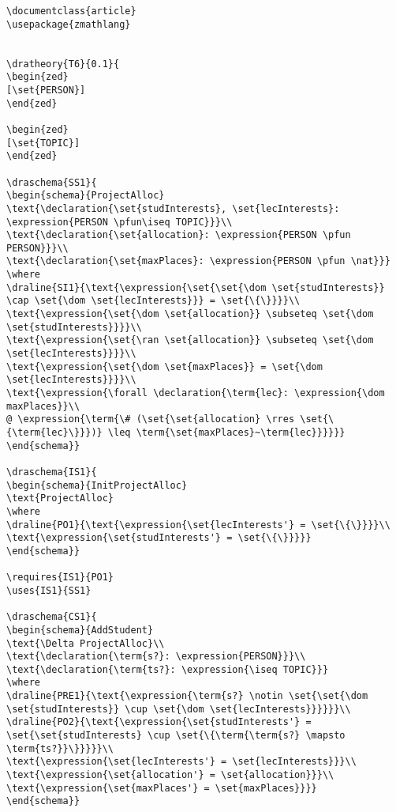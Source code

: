 \begin{verbatim}
\documentclass{article}
\usepackage{zmathlang}


\dratheory{T6}{0.1}{
\begin{zed}
[\set{PERSON}]
\end{zed}

\begin{zed}
[\set{TOPIC}]
\end{zed}

\draschema{SS1}{
\begin{schema}{ProjectAlloc}
\text{\declaration{\set{studInterests}, \set{lecInterests}: \expression{PERSON \pfun\iseq TOPIC}}}\\
\text{\declaration{\set{allocation}: \expression{PERSON \pfun PERSON}}}\\
\text{\declaration{\set{maxPlaces}: \expression{PERSON \pfun \nat}}}
\where
\draline{SI1}{\text{\expression{\set{\set{\dom \set{studInterests}} \cap \set{\dom \set{lecInterests}}} = \set{\{\}}}}\\
\text{\expression{\set{\dom \set{allocation}} \subseteq \set{\dom \set{studInterests}}}}\\
\text{\expression{\set{\ran \set{allocation}} \subseteq \set{\dom \set{lecInterests}}}}\\
\text{\expression{\set{\dom \set{maxPlaces}} = \set{\dom \set{lecInterests}}}}\\
\text{\expression{\forall \declaration{\term{lec}: \expression{\dom maxPlaces}}\\
@ \expression{\term{\# (\set{\set{allocation} \rres \set{\{\term{lec}\}}})} \leq \term{\set{maxPlaces}~\term{lec}}}}}}
\end{schema}}

\draschema{IS1}{
\begin{schema}{InitProjectAlloc}
\text{ProjectAlloc}
\where
\draline{PO1}{\text{\expression{\set{lecInterests'} = \set{\{\}}}}\\
\text{\expression{\set{studInterests'} = \set{\{\}}}}}
\end{schema}}

\requires{IS1}{PO1}
\uses{IS1}{SS1}

\draschema{CS1}{
\begin{schema}{AddStudent}
\text{\Delta ProjectAlloc}\\
\text{\declaration{\term{s?}: \expression{PERSON}}}\\
\text{\declaration{\term{ts?}: \expression{\iseq TOPIC}}}
\where
\draline{PRE1}{\text{\expression{\term{s?} \notin \set{\set{\dom \set{studInterests}} \cup \set{\dom \set{lecInterests}}}}}}\\
\draline{PO2}{\text{\expression{\set{studInterests'} = \set{\set{studInterests} \cup \set{\{\term{\term{s?} \mapsto \term{ts?}}\}}}}}\\
\text{\expression{\set{lecInterests'} = \set{lecInterests}}}\\
\text{\expression{\set{allocation'} = \set{allocation}}}\\
\text{\expression{\set{maxPlaces'} = \set{maxPlaces}}}}
\end{schema}}


\end{verbatim}
